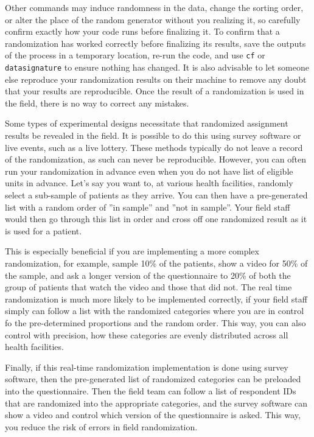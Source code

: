 Other commands may induce randomness in the data,
change the sorting order,
or alter the place of the random generator without you realizing it,
so carefully confirm exactly how your code runs before finalizing it.
To confirm that a randomization has worked correctly before finalizing its results,
save the outputs of the process in a temporary location,
re-run the code, and use \texttt{cf} or \texttt{datasignature} to ensure
nothing has changed. It is also advisable to let someone else reproduce your
randomization results on their machine to remove any doubt that your results
are reproducible.
Once the result of a randomization is used in the field,
there is no way to correct any mistakes.


Some types of experimental designs necessitate
that randomized assignment results be revealed in the field.
It is possible to do this using survey software or live events, such as a live lottery.
These methods typically do not leave a record of the randomization,
as such can never be reproducible. 
However, you can often run your randomization in advance 
even when you do not have list of eligible units in advance.
Let's say you want to, at various health facilities, 
randomly select a sub-sample of patients as they arrive.
You can then have a pre-generated list 
with a random order of ''in sample'' and ''not in sample''.
Your field staff would then go through this list in order
and cross off one randomized result as it is used for a patient.

This is especially beneficial if you are implementing a more complex randomization,
for example, sample 10\% of the patients, show a video for 50\% of the sample, 
and ask a longer version of the questionnaire to 20\% of both 
the group of patients that watch the video and those that did not.
The real time randomization is much more likely to be implemented correctly,
if your field staff simply can follow a list with the randomized categories
where you are in control fo the pre-determined proportions and the random order.
This way, you can also control with precision,
how these categories are evenly distributed across all health facilities.

Finally, if this real-time randomization implementation is done using survey software,
then the pre-generated list of randomized categories can be preloaded
into the questionnaire.
Then the field team can follow a list of respondent IDs 
that are randomized into the appropriate categories,
and the survey software can show a video and control which version of the questionnaire is asked.
This way, you reduce the risk of errors in field randomization.



